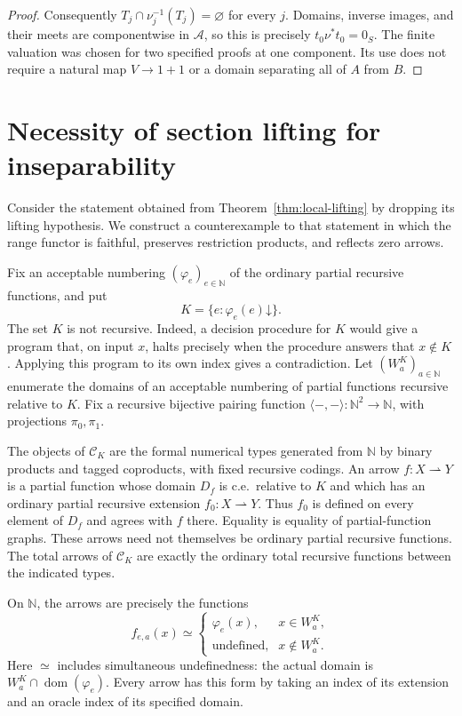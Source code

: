 \documentclass[11pt]{article}
\newcommand{\N}{\mathbb N}
\begin{document}
\begin{proof}
Consequently $T_j\cap\nu_j^{-1}(T_j)=\varnothing$ for every
$j$. Domains, inverse images, and their meets are componentwise
in $\mathcal A$, so this is precisely $t_0\nu^*t_0=0_S$.
The finite valuation was chosen for two specified proofs at one
component. Its use does not require a natural map $V\to1+1$
or a domain separating all of $A$ from $B$.
\end{proof}

\section{Necessity of section lifting for inseparability}
\label{app:lifting-counterexample}

Consider the statement obtained from Theorem~\ref{thm:local-lifting}
by dropping its lifting hypothesis. We construct a counterexample to
that statement in which the range functor is faithful, preserves
restriction products, and reflects zero arrows.

Fix an acceptable numbering $(\varphi_e)_{e\in\N}$ of the ordinary
partial recursive functions, and put
\[
 K=\{e:\varphi_e(e)\mathord\downarrow\}.
\]
The set $K$ is not recursive. Indeed, a decision procedure for $K$
would give a program that, on input $x$, halts precisely when the
procedure answers that $x\notin K$. Applying this program to its own
index gives a contradiction.
Let $(W_a^K)_{a\in\N}$ enumerate the domains of an acceptable
numbering of partial functions recursive relative to $K$.
Fix a recursive bijective pairing function
$\langle-,-\rangle:\N^2\to\N$, with projections $\pi_0,\pi_1$.

The objects of $\mathcal C_K$ are the formal numerical types generated
from $\N$ by binary products and tagged coproducts, with fixed recursive
codings. An arrow $f:X\rightharpoonup Y$ is a partial function whose
domain $D_f$ is c.e.\ relative to $K$ and which has an ordinary partial
recursive extension $f_0:X\rightharpoonup Y$. Thus $f_0$ is defined
on every element of $D_f$ and agrees with $f$ there. Equality is equality
of partial-function graphs. These arrows need not themselves be ordinary
partial recursive functions. The total arrows of $\mathcal C_K$ are exactly
the ordinary total recursive functions between the indicated types.

On $\N$, the arrows are precisely the functions
\[
 f_{e,a}(x)\simeq
 \begin{cases}
  \varphi_e(x),&x\in W_a^K,\\
  \text{undefined},&x\notin W_a^K.
 \end{cases}
\]
Here $\simeq$ includes simultaneous undefinedness: the actual domain
is $W_a^K\cap\operatorname{dom}(\varphi_e)$. Every arrow has this
form by taking an index of its extension and an oracle index of its
specified domain.
\end{document}
